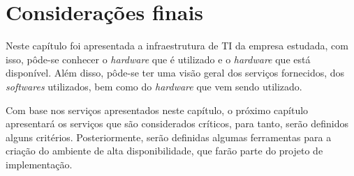 \section{Considerações finais}

Neste capítulo foi apresentada a infraestrutura de \ac{TI} da empresa estudada, com isso, pôde-se conhecer o \textit{hardware} que é utilizado 
e o \textit{hardware} que está disponível. Além disso, pôde-se ter uma visão geral dos serviços fornecidos, dos \textit{softwares} utilizados, 
bem como do \textit{hardware} que vem sendo utilizado. 

Com base nos serviços apresentados neste capítulo, o próximo capítulo apresentará os serviços que são considerados críticos, para tanto, 
serão definidos alguns critérios. Posteriormente, serão definidas algumas ferramentas para a criação do ambiente de alta disponibilidade, que 
farão parte do projeto de implementação.
